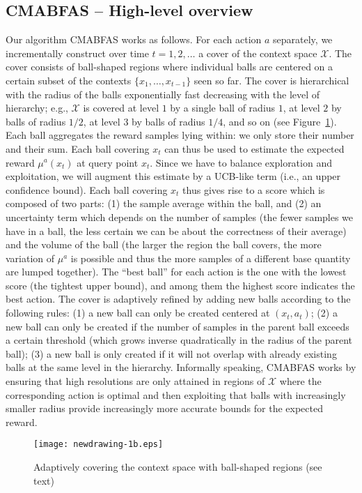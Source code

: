 \documentclass{llncs}
\begin{document}
\subsection{CMABFAS -- High-level overview} 
Our algorithm CMABFAS works as follows. For each action $a$ separately, we incrementally
construct over time $t=1,2,\ldots$ a cover of the context space $\mathcal X$. The cover 
consists of ball-shaped regions where individual balls are centered on a certain subset
of the contexts $\{x_1,\ldots,x_{t-1}\}$ seen so far. The cover is hierarchical with the radius
of the balls exponentially fast decreasing with the level of hierarchy; e.g., $\mathcal X$ is covered 
at level $1$ by a single ball of radius $1$, at level $2$ by balls of radius $1/2$, at 
level $3$ by balls of radius $1/4$, and so on (see Figure~\ref{fig:12}). Each ball aggregates the reward samples
lying within: we only store their number and their sum. Each ball covering $x_t$ can thus
be used to estimate the expected reward $\mu^a(x_t)$ at query point $x_t$. Since we have to 
balance exploration and exploitation, we will augment this estimate by a UCB-like term (i.e., 
an upper confidence bound). Each ball
covering $x_t$ thus gives rise to a score which is composed of two parts: (1) the sample 
average within the ball, and (2) an uncertainty term which depends on the number
of samples (the fewer samples we have in a ball, the less certain we can be
about the correctness of their average) and the volume of the ball (the larger 
the region the ball covers, the more variation of $\mu^a$ is possible and thus the 
more samples of a different base quantity are lumped together). The ``best ball'' 
for each action is the one with the lowest score (the tightest upper bound), and 
among them the highest score indicates the best action.  
The cover is adaptively refined by adding new balls according to the following rules: 
(1) a new ball can only be created centered at $(x_t,a_t)$; (2) a new ball can 
only be created if the number of samples in the parent ball exceeds a certain
threshold (which grows inverse quadratically in the radius of the parent ball);
(3) a new ball is only created if it will not overlap with already existing balls
at the same level in the hierarchy. Informally speaking, CMABFAS works by ensuring
that high resolutions are only attained in regions of $\mathcal X$ where the 
corresponding action is optimal and then exploiting that balls with increasingly smaller
radius provide increasingly more accurate bounds for the expected reward.


\begin{figure}[!t]
\begin{center}
\texttt{[image: newdrawing-1b.eps]}
\end{center}
\caption{Adaptively covering the context space with ball-shaped regions (see text)}
\label{fig:12}
\end{figure}
\end{document}
